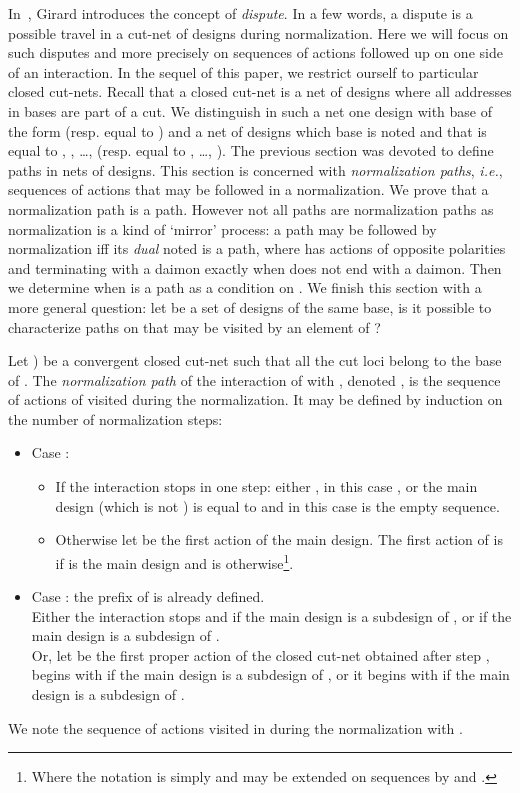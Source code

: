 \documentclass{LMCS}
\def\ie{{\em i.e.}}
\begin{document}
In~\cite{DBLP:journals/mscs/Girard01}, Girard introduces the concept of {\em dispute}. In a few words, a dispute is a possible travel in a cut-net of designs during normalization. 
Here we will focus on such disputes and more precisely on sequences of actions followed up on one side of an interaction.
In the sequel of this paper, we restrict ourself to particular closed cut-nets. Recall that a closed cut-net is a net of designs where all addresses in bases are part of a cut. 
We distinguish in such a net one design with base  of the form
  (resp. equal to ) and a net of designs which base is noted  and that is equal to , , \dots,  (resp.   equal to , \dots, ). 
The previous section was devoted to define paths in nets of designs.
This section is concerned with {\em normalization paths}, \ie, sequences of actions that may be followed in a normalization. 
We prove that a normalization path is a path. However not all paths are normalization paths as normalization is a kind of `mirror' process: a path  may be followed by normalization iff its {\em dual} noted  is a path, where  has actions of opposite polarities and terminating with a daimon exactly  when  does not end with a daimon. 
Then we determine when  is a path as a condition on .
We finish this section with a more general question: let  be a set of designs of the same base, is it possible to characterize paths on  that may be visited by an element of ?


\begin{defi}
Let ) be a convergent closed cut-net such that all the cut loci belong to the base of . The {\em normalization path} of the interaction of  with , denoted , is the sequence of actions of  visited during the normalization. It  may be defined by induction on the number  of normalization steps:
\begin{itemize}
\item Case :
\begin{itemize}
\item If the interaction stops in one step: either ,
  in this case , or
  the main design (which is not ) is equal to  and
  in this case  is the
  empty sequence.
\item Otherwise let  be the first action of the main
  design. The first action of
   is  if
   is the main design and is 
  otherwise\footnote{Where the notation  is simply
     and may be extended on
    sequences by  and
    .}.
\end{itemize}

\item Case : the prefix  of  is  already defined.\\
Either the interaction stops and  if the main design is a subdesign of , or  if the main design is a subdesign of .\\
Or, let  be the first proper action of the closed cut-net obtained after step ,  begins with  if the main design is a subdesign of , or it begins with  if the main design is a subdesign of .
\end{itemize}
We note  the sequence of actions visited in  during the normalization with .
\end{defi}
\end{document}
